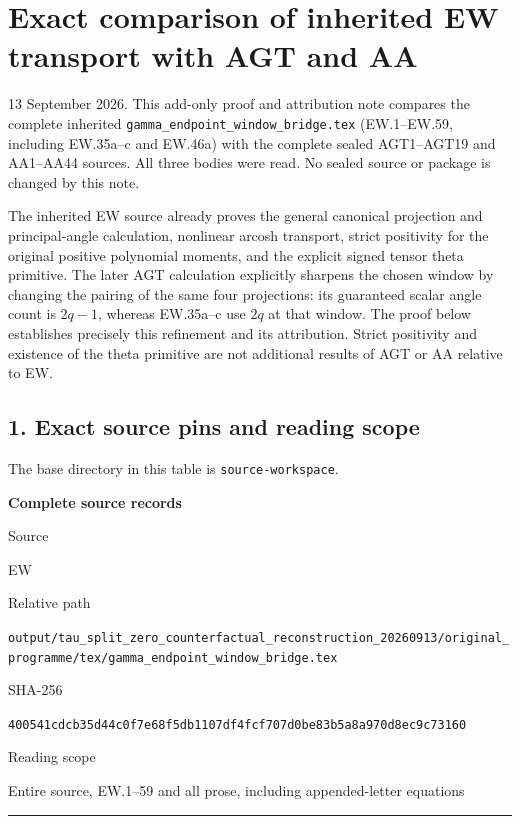 \section{Exact comparison of inherited EW transport with AGT and AA}\label{exact-comparison-of-inherited-ew-transport-with-agt-and-aa}

13 September 2026. This add-only proof and attribution note compares the complete inherited {\small\nolinkurl{gamma_endpoint_window_bridge.tex}} (EW.1--EW.59, including EW.35a--c and EW.46a) with the complete sealed AGT1--AGT19 and AA1--AA44 sources. All three bodies were read. No sealed source or package is changed by this note.

The inherited EW source already proves the general canonical projection and principal-angle calculation, nonlinear arcosh transport, strict positivity for the original positive polynomial moments, and the explicit signed tensor theta primitive. The later AGT calculation explicitly sharpens the chosen window by changing the pairing of the same four projections: its guaranteed scalar angle count is \(2q-1\), whereas EW.35a--c use \(2q\) at that window. The proof below establishes precisely this refinement and its attribution. Strict positivity and existence of the theta primitive are not additional results of AGT or AA relative to EW.

\subsection{1. Exact source pins and reading scope}\label{exact-source-pins-and-reading-scope}

The base directory in this table is \texttt{source-workspace}.

\textbf{Complete source records}

Source

EW

Relative path

{\small\nolinkurl{output/tau_split_zero_counterfactual_reconstruction_20260913/original_programme/tex/gamma_endpoint_window_bridge.tex}}

SHA-256

\nolinkurl{400541cdcb35d44c0f7e68f5db1107df4fcf707d0be83b5a8a970d8ec9c73160}

Reading scope

Entire source, EW.1--59 and all prose, including appended-letter equations

\begin{center}\rule{0.5\linewidth}{0.5pt}\end{center}

